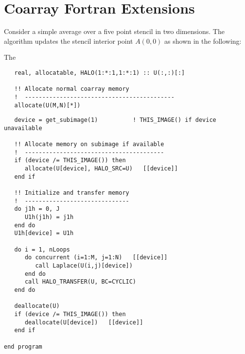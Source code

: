 \section{Coarray Fortran Extensions}


Consider a simple average over a five point stencil in two dimensions.  The algorithm updates the
stencil interior point $A(0,0)$ as shown in the following:

The 

\begin{verbatim}
   real, allocatable, HALO(1:*:1,1:*:1) :: U(:,:)[:]

   !! Allocate normal coarray memory
   !  -------------------------------------------
   allocate(U(M,N)[*])
\end{verbatim}

\begin{verbatim}
   device = get_subimage(1)          ! THIS_IMAGE() if device unavailable

   !! Allocate memory on subimage if available
   !  ----------------------------------------
   if (device /= THIS_IMAGE()) then
      allocate(U[device], HALO_SRC=U)   [[device]]
   end if

   !! Initialize and transfer memory
   !  ------------------------------
   do j1h = 0, J
      U1h(j1h) = j1h
   end do
   U1h[device] = U1h

   do i = 1, nLoops
      do concurrent (i=1:M, j=1:N)   [[device]]
         call Laplace(U(i,j)[device])
      end do
      call HALO_TRANSFER(U, BC=CYCLIC)
   end do

   deallocate(U)
   if (device /= THIS_IMAGE()) then
      deallocate(U[device])   [[device]]
   end if
         
end program
\end{verbatim}



